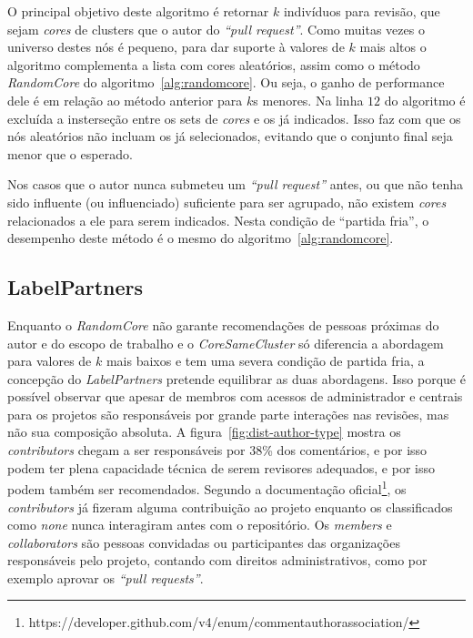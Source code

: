 \documentclass[12pt,openany,oneside,a4paper,english,brazil]{abntbibufjf}
\begin{document}
  O principal objetivo deste algoritmo é retornar $k$ indivíduos para revisão, que sejam \textit{cores} de clusters que o autor do \textit{``pull request''}. Como muitas vezes o universo destes nós é pequeno, para dar suporte à valores de $k$ mais altos o algoritmo complementa a lista com cores aleatórios, assim como o método \textit{RandomCore} do algoritmo~\ref{alg:randomcore}. Ou seja, o ganho de performance dele é em relação ao método anterior para $k$s menores. Na linha $12$ do algoritmo é excluída a insterseção entre os sets de \textit{cores} e os já indicados. Isso faz com que os nós aleatórios não incluam os já selecionados, evitando que o conjunto final seja menor que o esperado.

   Nos casos que o autor nunca submeteu um \textit{``pull request''} antes, ou que não tenha sido influente (ou influenciado) suficiente para ser agrupado, não existem \textit{cores} relacionados a ele para serem indicados. Nesta condição de ``partida fria'', o desempenho deste método é o mesmo do algoritmo~\ref{alg:randomcore}.
  \subsection{LabelPartners}
  Enquanto o \textit{RandomCore} não garante recomendações de pessoas próximas do autor e do escopo de trabalho e o \textit{CoreSameCluster} só diferencia a abordagem para valores de $k$ mais baixos e tem uma severa condição de partida fria, a concepção do \textit{LabelPartners} pretende equilibrar as duas abordagens. Isso porque é possível observar que apesar de membros com acessos de administrador e centrais para os projetos são responsáveis por grande parte interações nas revisões, mas não sua composição absoluta. A figura~\ref{fig:dist-author-type} mostra os \textit{contributors} chegam a ser responsáveis por 38\% dos comentários, e por isso podem ter plena capacidade técnica de serem revisores adequados, e por isso podem também ser recomendados. Segundo a documentação oficial\footnote{https://developer.github.com/v4/enum/commentauthorassociation/}, os \textit{contributors} já fizeram alguma contribuição ao projeto enquanto os classificados como \textit{none} nunca interagiram antes com o repositório. Os \textit{members} e \textit{collaborators} são pessoas convidadas ou participantes das organizações responsáveis pelo projeto, contando com direitos administrativos, como por exemplo aprovar os \textit{``pull requests''}.
\end{document}
